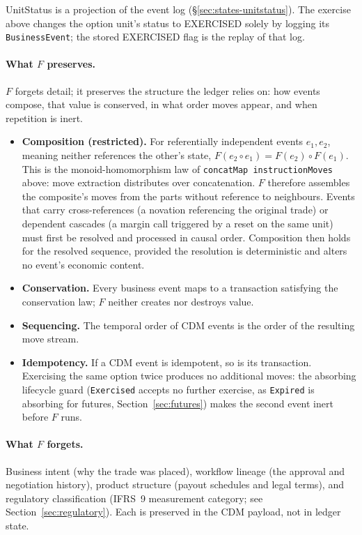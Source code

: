 \begin{remark}
UnitStatus is a projection of the event log (\S\ref{sec:states-unitstatus}). The exercise above changes the option unit's status to EXERCISED solely by logging its \texttt{BusinessEvent}; the stored EXERCISED flag is the replay of that log.
\end{remark}

\paragraph{What \texorpdfstring{$F$}{F} preserves.}
$F$ forgets detail; it preserves the structure the ledger relies on: how events compose, that value is conserved, in what order moves appear, and when repetition is inert.
\begin{itemize}[nosep]
\item \textbf{Composition (restricted).} For referentially independent events $e_1, e_2$, meaning neither references the other's state, $F(e_2 \circ e_1) = F(e_2) \circ F(e_1)$. This is the monoid-homomorphism law of \texttt{concatMap instructionMoves} above: move extraction distributes over concatenation. $F$ therefore assembles the composite's moves from the parts without reference to neighbours. Events that carry cross-references (a novation referencing the original trade) or dependent cascades (a margin call triggered by a reset on the same unit) must first be resolved and processed in causal order. Composition then holds for the resolved sequence, provided the resolution is deterministic and alters no event's economic content.
\item \textbf{Conservation.} Every business event maps to a transaction satisfying the conservation law; $F$ neither creates nor destroys value.
\item \textbf{Sequencing.} The temporal order of CDM events is the order of the resulting move stream.
\item \textbf{Idempotency.} If a CDM event is idempotent, so is its transaction. Exercising the same option twice produces no additional moves: the absorbing lifecycle guard (\texttt{Exercised} accepts no further exercise, as \texttt{Expired} is absorbing for futures, Section~\ref{sec:futures}) makes the second event inert before $F$ runs.
\end{itemize}

\paragraph{What \texorpdfstring{$F$}{F} forgets.} Business intent (why the trade was placed), workflow lineage (the approval and negotiation history), product structure (payout schedules and legal terms), and regulatory classification (IFRS~9 measurement category; see Section~\ref{sec:regulatory}). Each is preserved in the CDM payload, not in ledger state.

